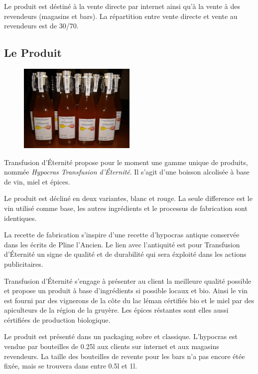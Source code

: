 \documentclass[10pt,a4paper]{article}
\newcommand{\tde}{Transfusion d'Éternité}
\begin{document}
Le produit est déstiné à la vente directe par internet ainsi qu'à la vente à des revendeurs (magasins et bars).
La répartition entre vente directe et vente au revendeurs est de 30/70.
\subsection{Le Produit}
\begin{figure}[h]
\centering
\includegraphics[width=0.5\textwidth]{../images/bouteilles.jpg}
\end{figure}

\tde{} propose pour le moment une gamme unique de produits, nommée \textit{Hypocras \tde{}}.
Il s'agit d'une boisson alcolisée à base de vin, miel et épices.

Le produit est décliné en deux variantes, blanc et rouge.
La seule difference est le vin utilisé comme base, les autres ingrédients et le processus de fabrication sont identiques.

La recette de fabrication s'inspire d'une recette d'hypocras antique conservée dans les écrits de Pline l'Ancien.
Le lien avec l'antiquité est pour \tde{} un signe de qualité et de durabilité qui sera éxploité dans les actions publicitaires.

\tde{} s'engage à présenter au client la meilleure qualité possible et propose un produit à base d'ingrédients si possible locaux et bio.
Ainsi le vin est fourni par des vignerons de la côte du lac léman cértifiés bio et le miel par des apiculteurs de la région de la gruyère.
Les épices réstantes sont elles aussi cértifiées de production biologique.

Le produit est présenté dans un packaging sobre et classique.
L'hypocras est vendue par bouteilles de 0.25l aux clients sur internet et aux magasins revendeurs.
La taille des bouteilles de revente pour les bars n'a pas encore étée fixée, mais se trouvera dans entre 0.5l et 1l.
\end{document}
